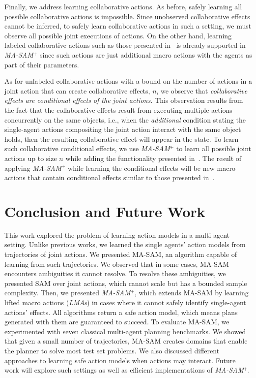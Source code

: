 \documentclass[letterpaper]{article} %
\theoremstyle{definition}
\theoremstyle{remark}
\newcommand{\sam}{\ac{SAM}\xspace}
\newcommand{\masam}{\ac{MA-SAM}\xspace}
\newcommand{\cmasam}{\textit{MA-SAM\ensuremath{^+}}\xspace}
\newcommand{\blmaas}{\textit{LMAs}\xspace}
\begin{document}
Finally, we address learning collaborative actions. As before, safely learning all possible collaborative actions is impossible. Since unobserved collaborative effects cannot be inferred, to safely learn collaborative actions in such a setting, we must observe all possible joint executions of actions. 
On the other hand, learning labeled collaborative actions such as those presented in~\cite{shekhar2020representing} is already supported in \cmasam since such actions are just additional macro actions with the agents as part of their parameters. 

As for unlabeled collaborative actions with a bound on the number of actions in a joint action that can create collaborative effects, $n$, we observe that \textit{collaborative effects are conditional effects of the joint actions.} This observation results from the fact that the collaborative effects result from executing multiple actions concurrently on the same objects, i.e., when the \textit{additional} condition stating the single-agent actions compositing the joint action interact with the same object holds, then the resulting collaborative effect will appear in the state. To learn such collaborative conditional effects, we use \cmasam to learn all possible joint actions up to size $n$ while adding the functionality presented in~\cite{mordoch2023safe}. The result of applying \cmasam while learning the conditional effects will be new macro actions that contain conditional effects similar to those presented in~\cite{hofmann2020macro}.


\section{Conclusion and Future Work}
\label{sec:conclusions}
This work explored the problem of learning action models in a multi-agent setting.
Unlike previous works, we learned the single agents' action models from trajectories of joint actions. 
We presented \masam, an algorithm capable of learning from such trajectories. We observed that in some cases, \masam encounters ambiguities it cannot resolve. To resolve these ambiguities, we presented \sam over joint actions, which cannot scale but has a bounded sample complexity. 
Then, we presented \cmasam, which extends \masam by learning lifted macro actions (\blmaas) in cases where it cannot safely identify single-agent actions' effects. 
All algorithms return a safe action model, which means plans generated with them are guaranteed to succeed. 
To evaluate \masam, we experimented with seven classical multi-agent planning benchmarks. 
We showed that given a small number of trajectories, \masam creates domains that enable the planner to solve most test set problems. 
We also discussed different approaches to learning safe action models when actions may interact. 
Future work will explore such settings as well as efficient implementations of \cmasam. %
\end{document}
